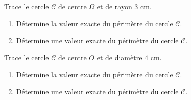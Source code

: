 \begin{pageCours}
% 

\end{pageCours} 
\begin{pageAD} 


\begin{minipage}{.38\linewidth}
 
Trace le cercle $\mathcal{C}$ de centre $\Omega$ et de rayon $3$ cm.



 \end{minipage}
 \hfill
 \begin{minipage}{.58\linewidth}
\begin{enumerate}
\item Détermine la valeur exacte du périmètre du cercle $\mathcal{C}$. 
\item Détermine une valeur exacte du périmètre du cercle $\mathcal{C}$. 
 \end{enumerate}  
 \end{minipage}
 

\begin{minipage}{.38\linewidth}
 
Trace le cercle $\mathcal{C}$ de centre $O$ et de diamètre $4$ cm.



 \end{minipage}
 \hfill
 \begin{minipage}{.58\linewidth}
\begin{enumerate}
\item Détermine la valeur exacte du périmètre du cercle $\mathcal{C}$. 
\item Détermine une valeur exacte du périmètre du cercle $\mathcal{C}$. 
 \end{enumerate}  
 \end{minipage}
 


\end{pageAD}

